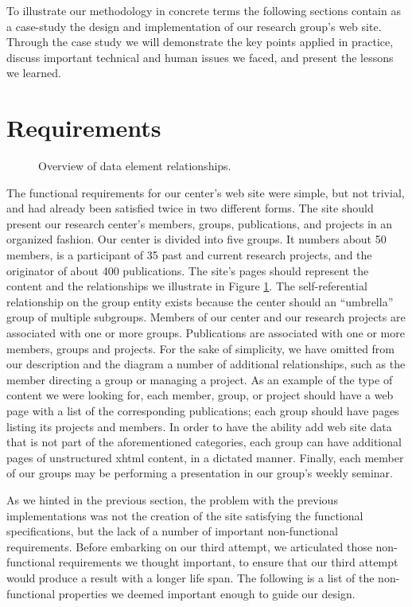 \documentclass[10pt]{article}
\begin{document}
To illustrate our methodology in concrete terms
the following sections contain as a case-study the design and implementation
of our research group's web site.
Through the case study we will demonstrate the key points applied in
practice, discuss important technical and human issues we faced,
and present the lessons we learned.

\section{Requirements}
\label{sec:req}

\begin{figure}
\begin{center}
\leavevmode
{}
\end{center}
\caption{
\label{fig:diag}
Overview of data element relationships.}
\end{figure}

The functional requirements for our center's web site were
simple, but not trivial, and had already been satisfied
twice in two different forms.
The site should present our research center's members, groups, publications,
and projects in an organized fashion.
Our center is divided into five groups.
It numbers about 50 members, is a participant of 35 past and current research
projects, and the originator of about 400 publications.
The site's pages should represent the content and the relationships
we illustrate in Figure \ref{fig:diag}.
The self-referential relationship on the group entity exists because the center should  an ``umbrella'' group of multiple subgroups.
Members of our center and our research projects are associated
with one or more groups.
Publications are associated
with one or more members, groups and projects.
For the sake of simplicity,
we have omitted from our description and the diagram
a number of additional relationships,
such as the member directing a group or managing a project.
As an example of the type of content we were looking for, 
each member, group, or project should have a web page with a list
of the corresponding publications;
each group should have pages listing its projects and members. 
In order to have the ability add web site data that is not part of the aforementioned categories,
each group can have additional pages of unstructured {\sc xhtml} content, in a dictated manner.
Finally, each member of our groups may be performing a presentation in our group's weekly seminar.

As we hinted in the previous section, the problem with
the previous implementations was not the creation of the site
satisfying the functional specifications,
but the lack of a number of important non-functional requirements.
Before embarking on our third attempt,
we articulated those non-functional requirements
we thought important, to ensure that our third attempt would produce
a result with a longer life span.
The following is a list of the non-functional properties
we deemed important enough to guide our design.
\end{document}
